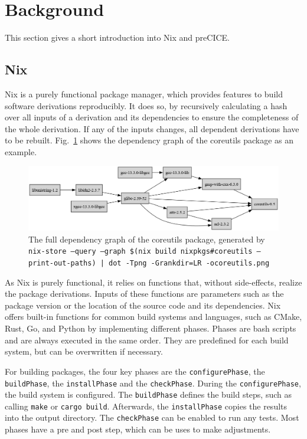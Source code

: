 \documentclass{eceasst}
\begin{document}
\section{Background}
\label{sec:background}

This section gives a short introduction into Nix and preCICE.

\subsection{Nix}\label{sec:nix}

Nix is a purely functional package manager, which provides features to build software derivations reproducibly.
It does so, by recursively calculating a hash over all inputs of a derivation and its dependencies to ensure the completeness of the whole derivation.
If any of the inputs changes, all dependent derivations have to be rebuilt.
Fig.~\ref{fig:nix-graph} shows the dependency graph of the coreutils package as an example.

\begin{figure}
    \centering
    \includegraphics[width=1\textwidth]{figures/coreutils.png}
    \caption{The full dependency graph of the coreutils package, generated by \texttt{nix-store --query --graph \$(nix build nixpkgs\#coreutils --print-out-paths) | dot -Tpng -Grankdir=LR -ocoreutils.png}}
    \label{fig:nix-graph}
\end{figure}

As Nix is purely functional, it relies on functions that, without side-effects, realize the package derivations.
Inputs of these functions are parameters such as the package version or the location of the source code and its dependencies.
Nix offers built-in functions for common build systems and languages, such as CMake, Rust, Go, and Python by implementing different phases.
Phases are bash scripts and are always executed in the same order. They are predefined for each build system, but can be overwritten if necessary.

For building packages, the four key phases are the \texttt{configurePhase}, the \texttt{buildPhase}, the \texttt{installPhase} and the \texttt{checkPhase}.
During the \texttt{configurePhase}, the build system is configured.
The \texttt{buildPhase} defines the build steps, such as calling \texttt{make} or \texttt{cargo build}.
Afterwards, the \texttt{installPhase} copies the results into the output directory.
The \texttt{checkPhase} can be enabled to run any tests.
Most phases have a pre and post step, which can be uses to make adjustments.
\end{document}

